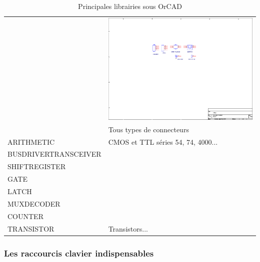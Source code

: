 \documentclass[a4paper]{article}
\begin{document}
\begin{table}[H]
\begin{tabular}{|l|l|}
			 & \includegraphics[scale=1.00]{Images/OrCAD_connector_olb}\\
			 & Tous types de connecteurs\\\hline
			{\ttfamily ARITHMETIC} & \ac{CMOS} et \ac{TTL} séries 54, 74, 4000...\\
			{\ttfamily BUSDRIVERTRANSCEIVER} & \\
			{\ttfamily SHIFTREGISTER} & \\
			{\ttfamily GATE} & \\
			{\ttfamily LATCH} & \\
			{\ttfamily MUXDECODER} & \\
			{\ttfamily COUNTER} & \\\hline
			{\ttfamily TRANSISTOR} & Transistors...\\\hline
	\end{tabular}
	\caption{Principales librairies sous OrCAD
		\label{Principales_librairies}}
\end{table}

\subsubsection{Les raccourcis clavier indispensables}
\end{document}
